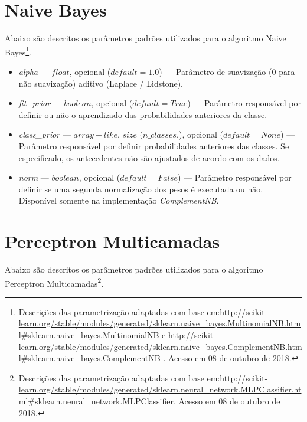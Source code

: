 \documentclass[
	12pt,				%
	oneside,			%
	a4paper,			%
	english,			%
	brazil				%
	]{abntex2ppgsi}
\begin{document}
{{\begin{apendicesenv}
\begin{itemize}
\end{itemize}

\section{Naive Bayes}

Abaixo são descritos os parâmetros padrões utilizados para o algoritmo Naive Bayes\footnote{Descrições das parametrização adaptadas com base em:\url{http://scikit-learn.org/stable/modules/generated/sklearn.naive_bayes.MultinomialNB.html\#sklearn.naive_bayes.MultinomialNB} e \url{http://scikit-learn.org/stable/modules/generated/sklearn.naive_bayes.ComplementNB.html\#sklearn.naive_bayes.ComplementNB} . Acesso em 08 de outubro de 2018.}.

\begin{itemize}
\item \textit{alpha} --- $float$, opcional ($default=1.0$) --- Parâmetro de suavização (0 para não suavização) aditivo (Laplace / Lidstone).
\item \textit{fit\_prior} --- $boolean$, opcional ($default=True$) --- Parâmetro responsável por definir ou não o aprendizado das probabilidades anteriores da classe.
\item \textit{class\_prior} --- $array-like$, $size$ ($n\_classes$,), opcional ($default=None$) --- Parâmetro responsável por definir probabilidades anteriores das classes. Se especificado, os antecedentes não são ajustados de acordo com os dados.
\item \textit{norm} --- $boolean$, opcional ($default=False$) ---
Parâmetro responsável por definir se uma segunda normalização dos pesos é executada ou não. Disponível somente na implementação \textit{ComplementNB}.
\end{itemize}

\section{Perceptron Multicamadas}

Abaixo são descritos os parâmetros padrões utilizados para o algoritmo Perceptron Multicamadas\footnote{Descrições das parametrização adaptadas com base em:\url{http://scikit-learn.org/stable/modules/generated/sklearn.neural_network.MLPClassifier.html\#sklearn.neural_network.MLPClassifier}. Acesso em 08 de outubro de 2018.}.


\end{apendicesenv}}}
\end{document}

